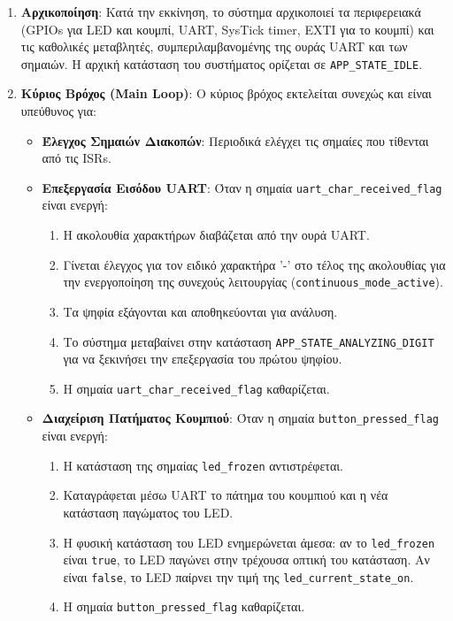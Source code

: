 \documentclass{article}
\begin{document}
\begin{enumerate}
    \item \textbf{Αρχικοποίηση}: Κατά την εκκίνηση, το σύστημα αρχικοποιεί τα περιφερειακά (GPIOs για LED και κουμπί, UART, SysTick timer, EXTI για το κουμπί) και τις καθολικές μεταβλητές, συμπεριλαμβανομένης της ουράς UART και των σημαιών. Η αρχική κατάσταση του συστήματος ορίζεται σε \texttt{APP\_STATE\_IDLE}.

    \item \textbf{Κύριος Βρόχος (Main Loop)}: Ο κύριος βρόχος εκτελείται συνεχώς και είναι υπεύθυνος για:
    \begin{itemize}
        \item \textbf{Έλεγχος Σημαιών Διακοπών}: Περιοδικά ελέγχει τις σημαίες που τίθενται από τις ISRs.

        \item \textbf{Επεξεργασία Εισόδου UART}: Όταν η σημαία \texttt{uart\_char\_received\_flag} είναι ενεργή:
        \begin{enumerate}
            \item Η ακολουθία χαρακτήρων διαβάζεται από την ουρά UART.
            \item Γίνεται έλεγχος για τον ειδικό χαρακτήρα '-' στο τέλος της ακολουθίας για την ενεργοποίηση της συνεχούς λειτουργίας (\texttt{continuous\_mode\_active}).
            \item Τα ψηφία εξάγονται και αποθηκεύονται για ανάλυση.
            \item Το σύστημα μεταβαίνει στην κατάσταση \texttt{APP\_STATE\_ANALYZING\_DIGIT} για να ξεκινήσει την επεξεργασία του πρώτου ψηφίου.
            \item Η σημαία \texttt{uart\_char\_received\_flag} καθαρίζεται.
        \end{enumerate}

        \item \textbf{Διαχείριση Πατήματος Κουμπιού}: Όταν η σημαία \texttt{button\_pressed\_flag} είναι ενεργή:
        \begin{enumerate}
            \item Η κατάσταση της σημαίας \texttt{led\_frozen} αντιστρέφεται.
            \item Καταγράφεται μέσω UART το πάτημα του κουμπιού και η νέα κατάσταση παγώματος του LED.
            \item Η φυσική κατάσταση του LED ενημερώνεται άμεσα: αν το \texttt{led\_frozen} είναι \texttt{true}, το LED παγώνει στην τρέχουσα οπτική του κατάσταση. Αν είναι \texttt{false}, το LED παίρνει την τιμή της \texttt{led\_current\_state\_on}.
            \item Η σημαία \texttt{button\_pressed\_flag} καθαρίζεται.
        \end{enumerate}


\end{itemize}
\end{enumerate}
\end{document}
